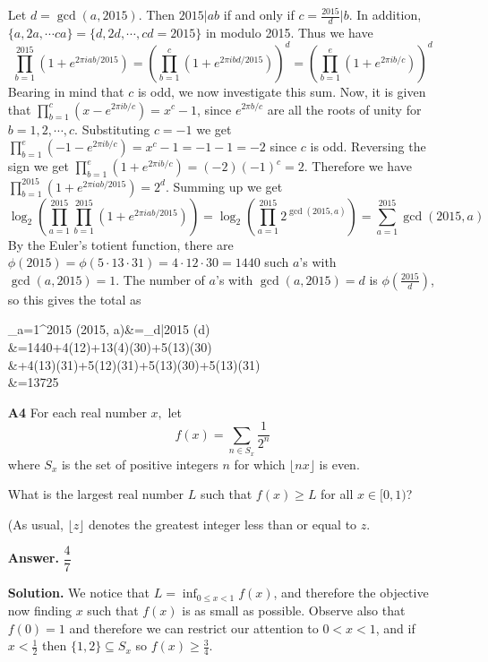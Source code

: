 \documentclass[11pt,a4paper]{article}
\newcommand{\<}{\langle}
\renewcommand{\>}{\rangle}
\begin{document}
\begin{enumerate}
	Let $d=\gcd(a, 2015)$. Then $2015|ab$ if and only if $c=\frac{2015}{d}|b$. In addition, $\{a, 2a, \cdots ca\} = \{d, 2d, \cdots , cd=2015\}$ in modulo 2015. Thus we have 
	\[\prod_{b=1}^{2015}\left(1+e^{2\pi iab/2015}\right)=\left(\prod_{b=1}^{c}\left(1+e^{2\pi ibd/2015}\right)\right)^d=\left(\prod_{b=1}^{e}\left(1+e^{2\pi ib/c}\right)\right)^d\]
	Bearing in mind that $c$ is odd, we now investigate this sum. Now, it is given that $\prod_{b=1}^{c}\left(x-e^{2\pi ib/c}\right)=x^c-1$, since $e^{2\pi b/c}$ are all the roots of unity for $b=1, 2, \cdots , c$. Substituting $c=-1$ we get $\prod_{b=1}^{e}\left(-1-e^{2\pi ib/c}\right)=x^c-1=-1-1=-2$ since $c$ is odd. 
	Reversing the sign we get $\prod_{b=1}^{e}\left(1+e^{2\pi ib/c}\right)=(-2)(-1)^{c}=2$. Therefore we have $\prod_{b=1}^{2015}\left(1+e^{2\pi iab/2015}\right)=2^d$. Summing up we get 
	\[\log_2\left(\prod_{a=1}^{2015}\prod_{b=1}^{2015}\left(1+e^{2\pi iab/2015}\right)\right) =\log_2\left(\prod_{a=1}^{2015}2^{\gcd(2015, a)}\right)
	=\sum_{a=1}^{2015} \gcd(2015, a)\]
	By the Euler's totient function, there are $\phi(2015)=\phi(5\cdot 13\cdot 31)=4\cdot 12\cdot 30=1440$ such $a$'s with $\gcd(a, 2015)=1$. The number of $a$'s with $\gcd(a, 2015)=d$ is $\phi(\frac{2015}{d})$, so this gives the total as 
	\begin{flalign*}
	\sum_{a=1}^{2015} \gcd(2015, a)&=\sum_{d|2015} \phi(d)\\
	&=1440+4(12)+13(4)(30)+5(13)(30)
	\\&+4(13)(31)+5(12)(31)+5(13)(30)+5(13)(31)\\
	&=13725\\
	\end{flalign*}
	
	\item[\textbf{A4}] 
	For each real number $x,$ let\[f(x)=\sum_{n\in S_x}\frac1{2^n}\]where $S_x$ is the set of positive integers $n$ for which $\lfloor nx\rfloor$ is even.
	
	What is the largest real number $L$ such that $f(x)\ge L$ for all $x\in [0,1)$?
	
	(As usual, $\lfloor z\rfloor$ denotes the greatest integer less than or equal to $z.$
	
	\textbf{Answer.} $\dfrac 47$
	
	\textbf{Solution.} We notice that $L=\inf_{0\le x<1} f(x)$, and therefore the objective now finding $x$ such that $f(x)$ is as small as possible. 
	Observe also that $f(0)=1$ and therefore we can restrict our attention to $0<x<1$, 
	and if $x<\frac 12$ then $\{1, 2\}\subseteq S_x$ so $f(x)\ge \frac 34$. 
	

\end{enumerate}
\end{document}

